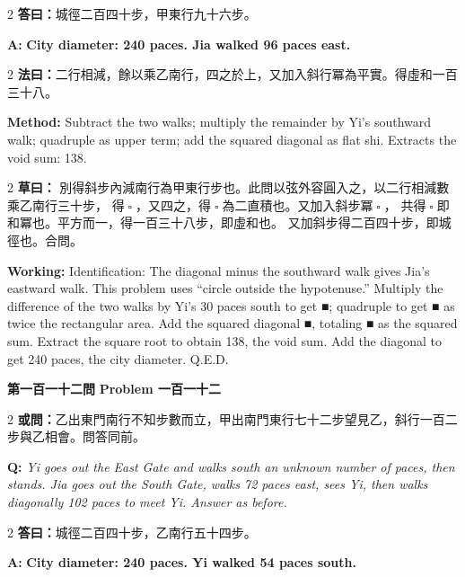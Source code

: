 \documentclass[11pt,a4paper]{article}
\let\origsquare\square
\renewcommand{\square}{\ensuremath{\origsquare}}%
\newcommand{\wen}[1]{%
  \par\vspace{0.5em}%
  \noindent\textcolor{problemcolor}{\textbf{第#1問}}%
  \hfill\textcolor{problemcolor}{\textbf{Problem #1}}\par\nopagebreak%
  \vspace{0.3em}%
}
\newcommand{\owen}[1]{%
  \noindent\textcolor{problemcolor}{\textbf{或問：}}{\tradfont #1}\par\nopagebreak%
}
\newcommand{\oweneng}[1]{%
  \noindent\textcolor{engcolor}{\textbf{Q: }}{\itshape #1}\par\nopagebreak%
}
\newcommand{\fayue}[1]{%
  \noindent\textcolor{methodcolor}{\textbf{法曰：}}{\tradfont #1}\par\nopagebreak%
}
\newcommand{\fayueeng}[1]{%
  \noindent\textcolor{engcolor}{\textbf{Method: }}{#1}\par\nopagebreak%
}
\newcommand{\tsaoyue}[1]{%
  \noindent\textcolor{workcolor}{\textbf{草曰：}}{\tradfont #1}\par%
}
\newcommand{\tsaoyueeng}[1]{%
  \noindent\textcolor{engcolor}{\textbf{Working: }}{\small #1}\par%
}
\newcommand{\dayue}[1]{%
  \noindent\textcolor{anscolor}{\textbf{答曰：}}{\tradfont #1}\par\nopagebreak%
}
\newcommand{\dayueeng}[1]{%
  \noindent\textcolor{engcolor}{\textbf{A: }}{\bfseries #1}\par\nopagebreak%
}
\begin{document}
\begin{paracol}{2}
\dayue{城徑二百四十步，甲東行九十六步。}
\switchcolumn
\dayueeng{City diameter: 240 paces. Jia walked 96 paces east.}
\end{paracol}

\begin{paracol}{2}
\fayue{二行相減，餘以乘乙南行，四之於上，又加入斜行冪為平實。得虛和一百三十八。}
\switchcolumn
\fayueeng{Subtract the two walks; multiply the remainder by Yi's southward walk; quadruple as upper term; add the squared diagonal as flat shi. Extracts the void sum: 138.}
\end{paracol}

\begin{paracol}{2}
\tsaoyue{%
別得斜步內減南行為甲東行步也。此問以弦外容圓入之，以二行相減數乘乙南行三十步，
得$ \; \square \; $，又四之，得$ \; \square \; $為二直積也。又加入斜步冪$ \; \square \; $，
共得$ \; \square \; $即和冪也。平方而一，得一百三十八步，即虛和也。
又加斜步得二百四十步，即城徑也。合問。}
\switchcolumn
\tsaoyueeng{%
Identification: The diagonal minus the southward walk gives Jia's eastward walk. This problem uses ``circle outside the hypotenuse.'' Multiply the difference of the two walks by Yi's 30 paces south to get ■; quadruple to get ■ as twice the rectangular area. Add the squared diagonal ■, totaling ■ as the squared sum. Extract the square root to obtain 138, the void sum. Add the diagonal to get 240 paces, the city diameter. Q.E.D.}
\end{paracol}

\vspace{0.5cm}

\wen{一百一十二}

\begin{paracol}{2}
\owen{乙出東門南行不知步數而立，甲出南門東行七十二步望見乙，斜行一百二步與乙相會。問答同前。}
\switchcolumn
\oweneng{Yi goes out the East Gate and walks south an unknown number of paces, then stands. Jia goes out the South Gate, walks 72 paces east, sees Yi, then walks diagonally 102 paces to meet Yi. Answer as before.}
\end{paracol}

\begin{paracol}{2}
\dayue{城徑二百四十步，乙南行五十四步。}
\switchcolumn
\dayueeng{City diameter: 240 paces. Yi walked 54 paces south.}
\end{paracol}
\end{document}
